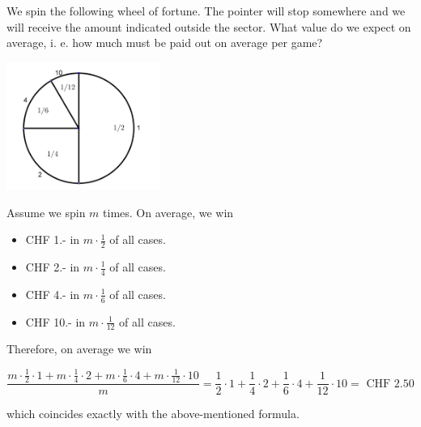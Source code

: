 \documentclass[twoside,11pt,a4paper]{article}
\newif\ifEN \ENtrue	                %
\def\tr|#1|#2|{\ifEN #2\else #1\fi}     %
\def\vsp{\vspace{5mm}}
\theoremstyle{definition}
\begin{document}
\begin{example}
\tr|Sie drehen am abgebildeten Glücksrad. Wenn es stoppt erhalten Sie den Betrag, der ausserhalb des Sektors steht, an dem 
das Glücksrad hält. Welchen Gewinn können Sie erwarten? 
|We spin the following wheel of fortune. 
The pointer will stop somewhere and we will receive the amount indicated outside the sector. 
What value do we expect on average, i. e. how much must be paid out on average per game?|
\begin{center}
\includegraphics[width=5cm]{Gluecksrad}
\end{center}
\tr|Wenn wir das Glücksrad $m$ mal drehen erhalten wir im Schnitt
|Assume we spin $m$ times. On average, we win|

\begin{itemize}
\item CHF 1.-  in $m\cdot\frac{1}{2}$  \tr|aller Fälle|of all cases|.
\item CHF 2.- in $m\cdot\frac{1}{4}$   \tr|aller Fälle|of all cases|.
\item CHF 4.- in $m\cdot\frac{1}{6}$   \tr|aller Fälle|of all cases|.
\item CHF 10.- in $m\cdot\frac{1}{12}$ \tr|aller Fälle|of all cases|.
\end{itemize}

\tr|Deshalb gewinnt man im Schnitt| Therefore, on average we win|

\[
\frac{m\cdot\frac{1}{2}\cdot 1+m\cdot\frac{1}{4}\cdot 2+m\cdot\frac{1}{6}\cdot 4+m\cdot\frac{1}{12}\cdot 10}{m}=\frac{1}{2}\cdot 1+\frac{1}{4}\cdot 2+\frac{1}{6}\cdot 4+\frac{1}{12}\cdot 10=\text{ CHF }2.50 
\]

\tr|was genau obiger Definition des Erwartungswertes entspricht.| which coincides exactly with the above-mentioned formula.|
\end{example}
\vsp
\end{document}
